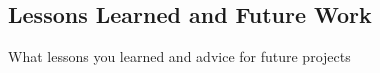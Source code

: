 \subsection{Lessons Learned and Future Work}
What lessons you learned and advice for future projects
